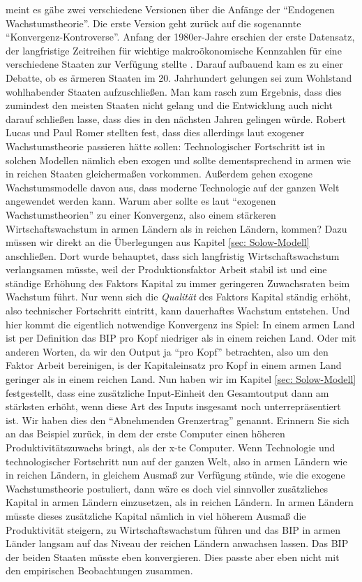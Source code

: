 \textcite{Romer1994} meint es gäbe zwei verschiedene Versionen über die Anfänge der "`Endogenen Wachstumstheorie"'. Die erste Version geht zurück auf die sogenannte "`Konvergenz-Kontroverse"'. Anfang der 1980er-Jahre erschien der erste Datensatz, der langfristige Zeitreihen für wichtige makroökonomische Kennzahlen für eine verschiedene Staaten zur Verfügung stellte \parencite{Maddison1982}. Darauf aufbauend kam es zu einer Debatte, ob es ärmeren Staaten im 20. Jahrhundert gelungen sei zum Wohlstand wohlhabender Staaten aufzuschließen. Man kam rasch zum Ergebnis, dass dies zumindest den meisten Staaten nicht gelang und die Entwicklung auch nicht darauf schließen lasse, dass dies in den nächsten Jahren gelingen würde. Robert Lucas und Paul Romer stellten fest, dass dies allerdings laut exogener Wachstumstheorie passieren hätte sollen: Technologischer Fortschritt ist in solchen Modellen nämlich eben exogen und sollte dementsprechend in armen wie in reichen Staaten gleichermaßen vorkommen. Außerdem gehen exogene Wachstumsmodelle davon aus, dass moderne Technologie auf der ganzen Welt angewendet werden kann. Warum aber sollte es laut "`exogenen Wachstumstheorien"' zu einer Konvergenz, also einem stärkeren Wirtschaftswachstum in armen Ländern als in reichen Ländern, kommen? Dazu müssen wir direkt an die Überlegungen aus Kapitel \ref{sec: Solow-Modell} anschließen. Dort wurde behauptet, dass sich langfristig Wirtschaftswachstum verlangsamen müsste, weil der Produktionsfaktor Arbeit stabil ist und eine ständige Erhöhung des Faktors Kapital zu immer geringeren Zuwachsraten beim Wachstum führt. Nur wenn sich die \textit{Qualität} des Faktors Kapital ständig erhöht, also technischer Fortschritt eintritt, kann dauerhaftes Wachstum entstehen. Und hier kommt die eigentlich notwendige Konvergenz ins Spiel: In einem armen Land ist per Definition das BIP pro Kopf niedriger als in einem reichen Land. Oder mit anderen Worten, da wir den Output ja "`pro Kopf"' betrachten, also um den Faktor Arbeit bereinigen, is der Kapitaleinsatz pro Kopf in einem armen Land geringer als in einem reichen Land. Nun haben wir im Kapitel \ref{sec: Solow-Modell} festgestellt, dass eine zusätzliche Input-Einheit den Gesamtoutput dann am stärksten erhöht, wenn diese Art des Inputs insgesamt noch unterrepräsentiert ist. Wir haben dies den "`Abnehmenden Grenzertrag"' genannt. Erinnern Sie sich an das Beispiel zurück, in dem der erste Computer einen höheren Produktivitätszuwachs bringt, als der x-te Computer. Wenn Technologie und technologischer Fortschritt nun auf der ganzen Welt, also in armen Ländern wie in reichen Ländern, in gleichem Ausmaß zur Verfügung stünde, wie die exogene Wachstumstheorie postuliert, dann wäre es doch viel sinnvoller zusätzliches Kapital in armen Ländern einzusetzen, als in reichen Ländern. In armen Ländern müsste dieses zusätzliche Kapital nämlich in viel höherem Ausmaß die Produktivität steigern, zu Wirtschaftswachstum führen und das BIP in armen Länder langsam auf das Niveau der reichen Ländern anwachsen lassen. Das BIP der beiden Staaten müsste eben konvergieren. Dies passte aber eben nicht mit den empirischen Beobachtungen zusammen. 
